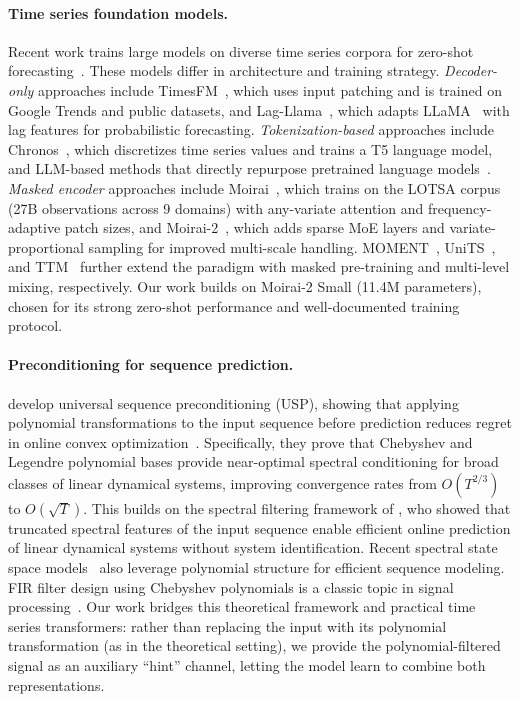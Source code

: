 \documentclass[11pt]{article}
\begin{document}
\paragraph{Time series foundation models.}
Recent work trains large models on diverse time series corpora for zero-shot forecasting~\citep{liang2024foundation}. These models differ in architecture and training strategy. \emph{Decoder-only} approaches include TimesFM~\citep{das2024decoder}, which uses input patching and is trained on Google Trends and public datasets, and Lag-Llama~\citep{rasul2024lagllama}, which adapts LLaMA~\citep{touvron2023llama} with lag features for probabilistic forecasting. \emph{Tokenization-based} approaches include Chronos~\citep{ansari2024chronos}, which discretizes time series values and trains a T5 language model, and LLM-based methods that directly repurpose pretrained language models~\citep{gruver2024llmts,zhou2024onefitsall}. \emph{Masked encoder} approaches include Moirai~\citep{woo2024unified}, which trains on the LOTSA corpus (27B observations across 9 domains) with any-variate attention and frequency-adaptive patch sizes, and Moirai-2~\citep{liu2024moirai2}, which adds sparse MoE layers and variate-proportional sampling for improved multi-scale handling. MOMENT~\citep{goswami2024moment}, UniTS~\citep{gao2024units}, and TTM~\citep{ekambaram2024ttm} further extend the paradigm with masked pre-training and multi-level mixing, respectively. Our work builds on Moirai-2 Small (11.4M parameters), chosen for its strong zero-shot performance and well-documented training protocol.

\paragraph{Preconditioning for sequence prediction.}
\citet{marsden2024universal} develop universal sequence preconditioning (USP), showing that applying polynomial transformations to the input sequence before prediction reduces regret in online convex optimization~\citep{hazan2016introduction}. Specifically, they prove that Chebyshev and Legendre polynomial bases provide near-optimal spectral conditioning for broad classes of linear dynamical systems, improving convergence rates from $O(T^{2/3})$ to $O(\sqrt{T})$. This builds on the spectral filtering framework of \citet{hazan2017learning,hazan2018spectral}, who showed that truncated spectral features of the input sequence enable efficient online prediction of linear dynamical systems without system identification. Recent spectral state space models~\citep{agarwal2025spectral,dao2024flashstu} also leverage polynomial structure for efficient sequence modeling. FIR filter design using Chebyshev polynomials is a classic topic in signal processing~\citep{parks1972chebyshev,oppenheim1999discrete,mcclellan1973program,haykin2002adaptive}. Our work bridges this theoretical framework and practical time series transformers: rather than replacing the input with its polynomial transformation (as in the theoretical setting), we provide the polynomial-filtered signal as an auxiliary ``hint'' channel, letting the model learn to combine both representations.
\end{document}
